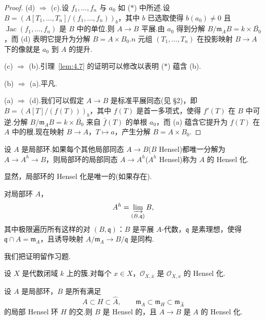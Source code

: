 \begin{proof}
(d) $\Rightarrow$ (c).设 $f_1, \ldots, f_n$ 与 $a_0$ 如 ($\ast$) 中所述.设 $B = (A[T_1, \ldots, T_n]/(f_1, \ldots, f_n))_b$，其中 $b$ 已选取使得 $b(a_0) \neq 0$ 且 $\operatorname{Jac}(f_1, \ldots, f_n)$ 是 $B$ 中的单位.则 $A \to B$ 平展.由 $a_0$ 得到分解 $B/\mathfrak{m}_{A}B = k \times \bar{B_0}$，而 (d) 表明它提升为分解 $B = A \times B_0$.$n$ 元组 $(T_1, \ldots, T_n)$ 在投影映射 $B \to A$ 下的像就是 $a_0$ 到 $A$ 的提升.

(c) $\Rightarrow$ (b).引理~\ref{lem:4.7} 的证明可以修改以表明 ($\ast$) 蕴含 (b).

(b) $\Rightarrow$ (a).平凡.

(a) $\Rightarrow$ (d).我们可以假定 $A \to B$ 是标准平展同态(见 \S 2)，即 $B = (A[T]/(f(T)))_b$，其中 $f(T)$ 是首一多项式，使得 $f'(T)$ 在 $B$ 中可逆.分解 $B/\mathfrak{m}_{A}B = k \times \bar{B_0}$ 来自 $\bar{f}(T)$ 的单根 $a_0$，而 (a) 蕴含它提升为 $f(T)$ 在 $A$ 中的根.现在映射 $B \to A$，$T \mapsto a$，产生分解 $B = A \times B_0$.
\end{proof}

\begin{definition}\label{def:4.12}
设 $A$ 是局部环.如果每个其他局部同态 $A \to B$($B$ Hensel)都唯一分解为 $A \to A^{h} \to B$，则局部环的局部同态 $A \to A^{h}$($A^{h}$ Hensel)称为 $A$ 的 Hensel 化.
\end{definition}

显然，局部环的 Hensel 化是唯一的(如果存在).

\begin{proposition}\label{prop:4.13}
对局部环 $A$，
\[
A^{h} = \varinjlim_{(B, \mathfrak{q})} B,
\]
其中极限遍历所有这样的对 $(B, \mathfrak{q})$：$B$ 是平展 $A$-代数，$\mathfrak{q}$ 是素理想，使得 $\mathfrak{q} \cap A = \mathfrak{m}_{A}$，且诱导映射 $A/\mathfrak{m}_{A} \to B/\mathfrak{q}$ 是同构.
\end{proposition}

我们把证明留作习题.

\begin{corollary}\label{cor:4.14}
设 $X$ 是代数闭域 $k$ 上的簇.对每个 $x \in X$，$\mathcal{O}_{X, \bar{x}}$ 是 $\mathcal{O}_{X, x}$ 的 Hensel 化.
\end{corollary}

\begin{proposition}\label{prop:4.15}
设 $A$ 是局部环，$B$ 是所有满足
\[
A \subset H \subset \widehat{A}, \qquad \mathfrak{m}_{A} \subset \mathfrak{m}_{H} \subset \mathfrak{m}_{\widehat{A}}
\]
的局部 Hensel 环 $H$ 的交.则 $B$ 是 Hensel 的，且 $A \to B$ 是 $A$ 的 Hensel 化.
\end{proposition}

